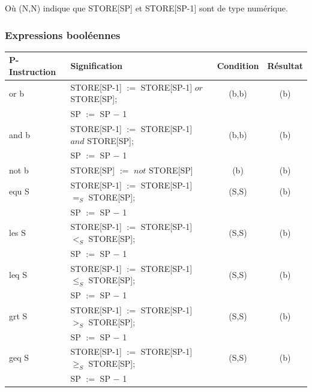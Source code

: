 \documentclass[french,11pt,twoside]{article}
\begin{document}
O\`{u}  (N,N) indique que STORE[SP] et STORE[SP-1] sont de type numérique.


\subsubsection{Expressions booléennes}

\begin{tabular}{|l|l|c|c|}
\hline
P-Instruction     & Signification                                                              & Condition & Résultat \\
\hline
or b                   & STORE[SP-1] $:=$ STORE[SP-1] $or$ STORE[SP];      & (b,b)          & (b)\\
                         & SP $:=$ SP $-$ 1                                                      &                  & \\
and b                & STORE[SP-1] $:=$ STORE[SP-1] $and$ STORE[SP];    & (b,b)          & (b)\\
                         & SP $:=$ SP $-$ 1                                                      &                  & \\
not b                 & STORE[SP] $:=$ $not$ STORE[SP]                              & (b)             & (b)\\
\hline
equ S                 & STORE[SP-1] $:=$ STORE[SP-1] $=_S$ STORE[SP];       & (S,S)          & (b)\\
                         & SP $:=$ SP $-$ 1                                                         &                  & \\
les S                  & STORE[SP-1] $:=$ STORE[SP-1] $<_S$ STORE[SP];       & (S,S)         & (b)\\
                         & SP $:=$ SP $-$ 1                                                          &                  & \\
leq S                 & STORE[SP-1] $:=$ STORE[SP-1] $\leq_S$ STORE[SP];    & (S,S)         & (b)\\
                         & SP $:=$ SP $-$ 1                                                          &                  & \\
grt S                  & STORE[SP-1] $:=$ STORE[SP-1] $>_S$ STORE[SP];        & (S,S)         & (b)\\
                         & SP $:=$ SP $-$ 1                                                           &                  & \\
geq S                & STORE[SP-1] $:=$ STORE[SP-1] $\geq_S$ STORE[SP];   & (S,S)         & (b)\\
                         & SP $:=$ SP $-$ 1                                                           &                  & \\
\hline
\end{tabular}
\\
\end{document}
